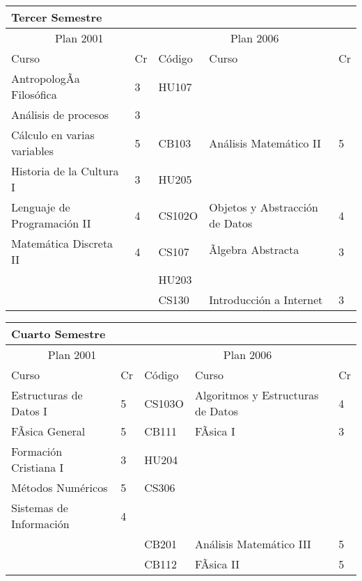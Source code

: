 \begin{center}
\begin{tabularx}{0.95\textwidth}{|p{4cm}|p{1cm}||p{2cm}|X|p{1cm}|}\hline
\multicolumn{5}{|l|}{\textbf{Tercer Semestre}} \\ \hline
\multicolumn{2}{|c|}{Plan 2001} & \multicolumn{3}{|c|}{Plan 2006} \\ \hline
Curso & Cr & Código & Curso & Cr \\ \hline
AntropologÃ­a Filosófica & 3 & HU107 &  & \\ \hline
Análisis de procesos & 3 &  &  & \\ \hline
Cálculo en varias variables & 5 & CB103 & Análisis Matemático II & 5 \\ \hline
Historia de la Cultura I & 3 & HU205 &  & \\ \hline
Lenguaje de Programación II & 4 & CS102O & Objetos y Abstracción de Datos & 4 \\ \hline
Matemática Discreta II & 4 & CS107 & Ãlgebra Abstracta & 3 \\ \hline
 &  & HU203 &  & \\ \hline
 &  & CS130 & Introducción a Internet & 3 \\ \hline
\end{tabularx}
\end{center}

\begin{center}
\begin{tabularx}{0.95\textwidth}{|p{4cm}|p{1cm}||p{2cm}|X|p{1cm}|}\hline
\multicolumn{5}{|l|}{\textbf{Cuarto Semestre}} \\ \hline
\multicolumn{2}{|c|}{Plan 2001} & \multicolumn{3}{|c|}{Plan 2006} \\ \hline
Curso & Cr & Código & Curso & Cr \\ \hline
Estructuras de Datos I & 5 & CS103O & Algoritmos y Estructuras de Datos & 4 \\ \hline
FÃ­sica General & 5 & CB111 & FÃ­sica I & 3 \\ \hline
Formación Cristiana I & 3 & HU204 &  & \\ \hline
Métodos Numéricos & 5 & CS306 &  & \\ \hline
Sistemas de Información & 4 &  &  & \\ \hline
 &  & CB201 & Análisis Matemático III & 5 \\ \hline
 &  & CB112 & FÃ­sica II & 5 \\ \hline
\end{tabularx}
\end{center}

